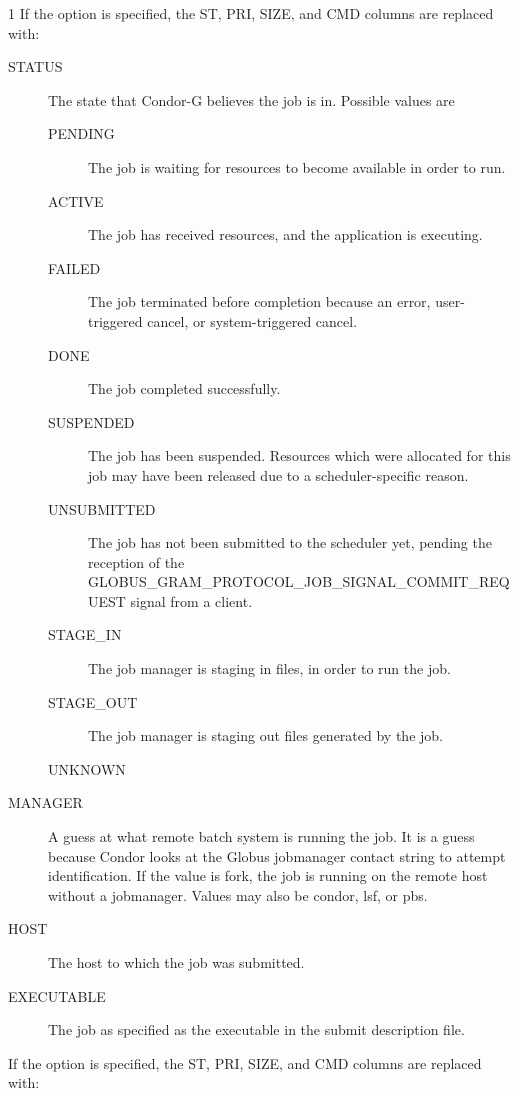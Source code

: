 \begin{ManPage}{\label{man-condor-q}}{1}
If the  option is specified, the ST, PRI, SIZE, and CMD
columns are replaced with:
\begin{description}
\item[STATUS] The state that Condor-G believes the job is in.
Possible values are
  \begin{description}
    \item[PENDING] The job is waiting for resources to become available
    in order to run.
    \item[ACTIVE] The job has received resources, and the application
    is executing.
    \item[FAILED] The job terminated before completion because an error,
    user-triggered cancel, or system-triggered cancel.
    \item[DONE] The job completed successfully.
    \item[SUSPENDED] The job has been suspended.
    Resources which were allocated for this job may have been
    released due to a scheduler-specific reason.
    \item[UNSUBMITTED] The job has not been submitted to the scheduler yet,
    pending the reception of the 
    GLOBUS\_GRAM\_PROTOCOL\_JOB\_SIGNAL\_COMMIT\_REQUEST signal from a client.
    \item[STAGE\_IN] The job manager is staging in files,
    in order to run the job.
    \item[STAGE\_OUT] The job manager is staging out files
    generated by the job.
    \item[UNKNOWN]
  \end{description}
\item[MANAGER] 
A guess at what remote batch system is running the job.
It is a guess because Condor looks at the Globus jobmanager contact
string to attempt identification.
If the value is fork, the job is running on the
remote host without a jobmanager.
Values may also be condor, lsf, or pbs.
\item[HOST] The host to which the job was submitted.
\item[EXECUTABLE] The job as specified as the executable in the
submit description file.
\end{description}

If the  option is specified, the ST, PRI, SIZE, and CMD
columns are replaced with:


\end{ManPage}
